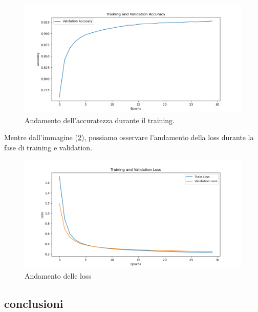 \begin{figure}[H]
    \centering
    \includegraphics[width=1.0\textwidth]{Immagini/Grafici/training_validation_accuracy_v1.png}
    \caption{Andamento dell'accuratezza durante il training.}
    \label{fig:DNN_accuracy_dopo}
\end{figure}

Mentre dall'immagine (\ref{fig:DNN_loss}), possiamo osservare l'andamento della loss 
durante la fase di training e validation. 

\begin{figure}[H]
    \centering
    \includegraphics[width=1.0\textwidth]{Immagini/Grafici/training_validation_loss_v1.png}
    \caption{Andamento delle loss}
    \label{fig:DNN_loss}
\end{figure}

\newpage
\subsection{conclusioni}

